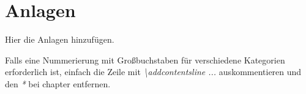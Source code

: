 \appendix%
\chapter*{Anlagen}%
\label{chap: anhang}%
Hier die Anlagen hinzufügen.

Falls eine Nummerierung mit Großbuchstaben für verschiedene Kategorien erforderlich ist, einfach die Zeile mit \emph{\textbackslash addcontentsline  ...} auskommentieren und den \emph{*} bei chapter entfernen.%
\newpage%